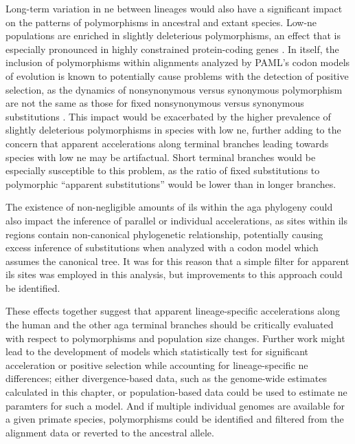 Long-term variation in \ac{ne} between lineages would also have a
significant impact on the patterns of polymorphisms in ancestral and
extant species. Low-\ac{ne} populations are enriched in slightly
deleterious polymorphisms, an effect that is especially pronounced in
highly constrained protein-coding genes \citep{Subramanian2011}. In
itself, the inclusion of polymorphisms within alignments analyzed by
PAML's codon models of evolution is known to potentially cause
problems with the detection of positive selection, as the dynamics of
nonsynonymous versus synonymous polymorphism are not the same as those
for fixed nonsynonymous versus synonymous substitutions
\citep{Kryazhimskiy2008}. This impact would be exacerbated by the
higher prevalence of slightly deleterious polymorphisms in species
with low \ac{ne}, further adding to the concern that apparent
accelerations along terminal branches leading towards species with low
\ac{ne} may be artifactual. Short terminal branches would be
especially susceptible to this problem, as the ratio of fixed
substitutions to polymorphic ``apparent substitutions'' would be lower
than in longer branches.

The existence of non-negligible amounts of \ac{ils} within the
\ac{aga} phylogeny could also impact the inference of parallel or
individual accelerations, as sites within \ac{ils} regions contain
non-canonical phylogenetic relationship, potentially causing excess
inference of substitutions when analyzed with a codon model which
assumes the canonical tree. It was for this reason that a simple
filter for apparent \ac{ils} sites was employed in this analysis, but
improvements to this approach could be identified.

These effects together suggest that apparent lineage-specific
accelerations along the human and the other \ac{aga} terminal branches
should be critically evaluated with respect to polymorphisms and
population size changes. Further work might lead to the development of
models which statistically test for significant \dnds acceleration or
positive selection while accounting for lineage-specific \ac{ne}
differences; either divergence-based data, such as the genome-wide
\dnds estimates calculated in this chapter, or population-based data
could be used to estimate \ac{ne} paramters for such a model. And if
multiple individual genomes are available for a given primate species,
polymorphisms could be identified and filtered from the alignment data
or reverted to the ancestral allele.

